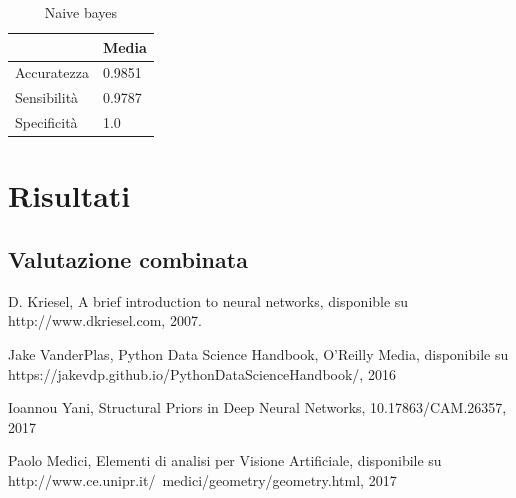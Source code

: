 \documentclass[a4paper,12pt]{report}
\begin{document}
\begin{table}
\caption{Naive bayes}
\begin{tabular}{|l|l|}
\hline
			& Media   \\ \hline
Accuratezza & 0.9851  \\ \hline
Sensibilità & 0.9787  \\ \hline
Specificità &    1.0  \\ \hline
\end{tabular}

\end{table}






% 
% 
\chapter{Risultati}
\label{cap3}
\section{Valutazione combinata}

% 
% 

%
%
\begin{thebibliography}{00}
%
%
D. Kriesel, A brief introduction to neural networks, disponible su
http://www.dkriesel.com, 2007. %
%

Jake VanderPlas, Python Data Science Handbook, O'Reilly Media, disponibile su
https://jakevdp.github.io/PythonDataScienceHandbook/, 2016

Ioannou Yani, Structural Priors in Deep Neural Networks, 10.17863/CAM.26357,
2017

Paolo Medici, Elementi di analisi per Visione Artificiale, disponibile su
http://www.ce.unipr.it/~medici/geometry/geometry.html, 2017


\end{thebibliography}
% 
\end{document}
